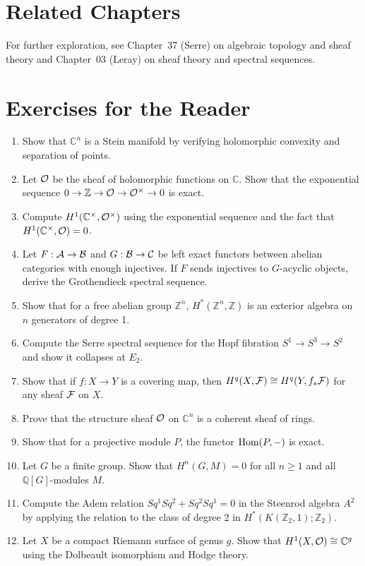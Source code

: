 \section{Related Chapters}
For further exploration, see Chapter~37 (Serre) on algebraic topology and sheaf theory and Chapter~03 (Leray) on sheaf theory and spectral sequences.

\section*{Exercises for the Reader}

\begin{enumerate}
    \item [B] Show that $\mathbb{C}^n$ is a Stein manifold by verifying holomorphic convexity and separation of points.
    \item [I] Let $\mathcal{O}$ be the sheaf of holomorphic functions on $\mathbb{C}$. Show that the exponential sequence $0 \to \mathbb{Z} \to \mathcal{O} \to \mathcal{O}^\times \to 0$ is exact.
    \item [I] Compute $H^1(\mathbb{C}^\times, \mathcal{O}^\times)$ using the exponential sequence and the fact that $H^1(\mathbb{C}^\times, \mathcal{O}) = 0$.
    \item [A] Let $F: \mathcal{A} \to \mathcal{B}$ and $G: \mathcal{B} \to \mathcal{C}$ be left exact functors between abelian categories with enough injectives. If $F$ sends injectives to $G$-acyclic objects, derive the Grothendieck spectral sequence.
    \item [I] Show that for a free abelian group $\mathbb{Z}^n$, $H^*(\mathbb{Z}^n, \mathbb{Z})$ is an exterior algebra on $n$ generators of degree 1.
    \item [I] Compute the Serre spectral sequence for the Hopf fibration $S^1 \to S^3 \to S^2$ and show it collapses at $E_2$.
    \item [I] Show that if $f: X \to Y$ is a covering map, then $H^q(X, \mathcal{F}) \cong H^q(Y, f_*\mathcal{F})$ for any sheaf $\mathcal{F}$ on $X$.
    \item [A] Prove that the structure sheaf $\mathcal{O}$ on $\mathbb{C}^n$ is a coherent sheaf of rings.
    \item [B] Show that for a projective module $P$, the functor $\operatorname{Hom}(P, -)$ is exact.
    \item [I] Let $G$ be a finite group. Show that $H^n(G, M) = 0$ for all $n \geq 1$ and all $\mathbb{Q}[G]$-modules $M$.
    \item [A] Compute the Adem relation $Sq^1 Sq^2 + Sq^2 Sq^1 = 0$ in the Steenrod algebra $A^2$ by applying the relation to the class of degree 2 in $H^*(K(\mathbb{Z}_2, 1); \mathbb{Z}_2)$.
    \item [I] Let $X$ be a compact Riemann surface of genus $g$. Show that $H^1(X, \mathcal{O}) \cong \mathbb{C}^g$ using the Dolbeault isomorphism and Hodge theory.
\end{enumerate}

